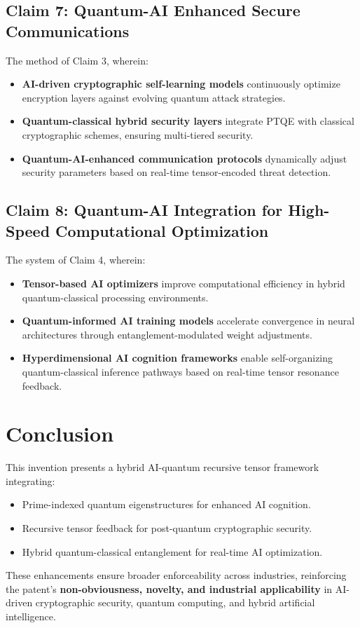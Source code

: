 \documentclass{article}
\theoremstyle{plain}
\begin{document}
\subsection{Claim 7: Quantum-AI Enhanced Secure Communications}   
The method of Claim 3, wherein:
\begin{itemize}  
    \item \textbf{AI-driven cryptographic self-learning models} continuously optimize encryption layers against evolving quantum attack strategies.  
    \item \textbf{Quantum-classical hybrid security layers} integrate PTQE with classical cryptographic schemes, ensuring multi-tiered security.  
    \item \textbf{Quantum-AI-enhanced communication protocols} dynamically adjust security parameters based on real-time tensor-encoded threat detection.  
\end{itemize}

\subsection{Claim 8: Quantum-AI Integration for High-Speed Computational Optimization}   
The system of Claim 4, wherein:
\begin{itemize}  
    \item \textbf{Tensor-based AI optimizers} improve computational efficiency in hybrid quantum-classical processing environments.  
    \item \textbf{Quantum-informed AI training models} accelerate convergence in neural architectures through entanglement-modulated weight adjustments.  
    \item \textbf{Hyperdimensional AI cognition frameworks} enable self-organizing quantum-classical inference pathways based on real-time tensor resonance feedback.  
\end{itemize}

\section{Conclusion}
This invention presents a hybrid AI-quantum recursive tensor framework integrating:
\begin{itemize}  
    \item Prime-indexed quantum eigenstructures for enhanced AI cognition.  
    \item Recursive tensor feedback for post-quantum cryptographic security.  
    \item Hybrid quantum-classical entanglement for real-time AI optimization.  
\end{itemize}
These enhancements ensure broader enforceability across industries, reinforcing the patent’s \textbf{non-obviousness, novelty, and industrial applicability} in AI-driven cryptographic security, quantum computing, and hybrid artificial intelligence.


\nolinenumbers



\end{document}
